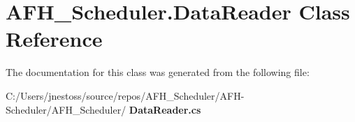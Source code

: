\section{A\+F\+H\+\_\+\+Scheduler.\+Data\+Reader Class Reference}
\label{class_a_f_h___scheduler_1_1_data_reader}


The documentation for this class was generated from the following file\+:\begin{DoxyCompactItemize}
\item 
C\+:/\+Users/jnestoss/source/repos/\+A\+F\+H\+\_\+\+Scheduler/\+A\+F\+H-\/\+Scheduler/\+A\+F\+H\+\_\+\+Scheduler/\textbf{ Data\+Reader.\+cs}\end{DoxyCompactItemize}
